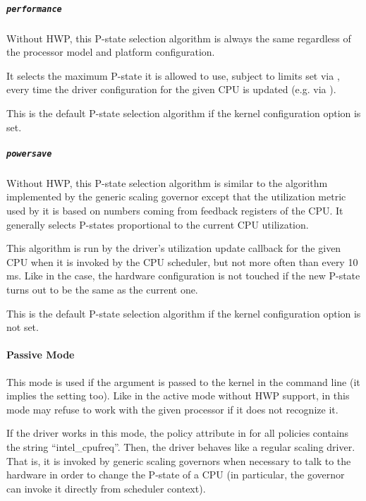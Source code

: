 \documentclass[a4paper,8pt,english]{sphinxmanual}
\begin{document}
\subparagraph{\texttt{performance}}
\label{admin-guide/pm/intel_pstate:performance}
Without HWP, this P-state selection algorithm is always the same regardless of
the processor model and platform configuration.

It selects the maximum P-state it is allowed to use, subject to limits set via
, every time the driver configuration for the given CPU is updated
(e.g. via ).

This is the default P-state selection algorithm if the
 kernel configuration option
is set.


\subparagraph{\texttt{powersave}}
\label{admin-guide/pm/intel_pstate:powersave}
Without HWP, this P-state selection algorithm is similar to the algorithm
implemented by the generic  scaling governor except that the
utilization metric used by it is based on numbers coming from feedback
registers of the CPU.  It generally selects P-states proportional to the
current CPU utilization.

This algorithm is run by the driver's utilization update callback for the
given CPU when it is invoked by the CPU scheduler, but not more often than
every 10 ms.  Like in the  case, the hardware configuration
is not touched if the new P-state turns out to be the same as the current
one.

This is the default P-state selection algorithm if the
 kernel configuration option
is not set.


\paragraph{Passive Mode}
\label{admin-guide/pm/intel_pstate:passive-mode}
This mode is used if the  argument is passed to the
kernel in the command line (it implies the  setting too).
Like in the active mode without HWP support, in this mode  may
refuse to work with the given processor if it does not recognize it.

If the driver works in this mode, the  policy attribute in
 for all  policies contains the string ``intel\_cpufreq''.
Then, the driver behaves like a regular  scaling driver.  That is,
it is invoked by generic scaling governors when necessary to talk to the
hardware in order to change the P-state of a CPU (in particular, the
 governor can invoke it directly from scheduler context).
\end{document}

